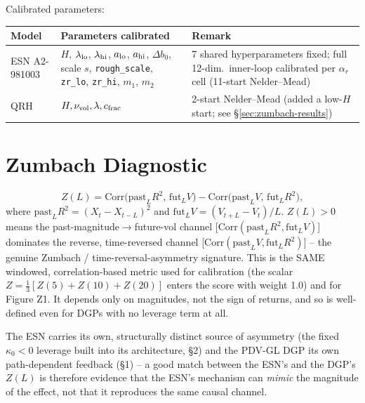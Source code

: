 \documentclass[11pt,a4paper]{article}
\begin{document}
Calibrated parameters:
\begin{center}\renewcommand{\arraystretch}{1.3}
\begin{tabular}{@{}p{3.0cm}p{6.4cm}p{5.0cm}@{}}\toprule
Model & Parameters calibrated & Remark \\\midrule
ESN A2-981003 & $H$, $\lambda_{\rm lo}$, $\lambda_{\rm hi}$, $a_{\rm lo}$,
  $a_{\rm hi}$, $\Delta b_0$, scale $s$, \texttt{rough\_scale},
  \texttt{zr\_lo}, \texttt{zr\_hi}, $m_1$, $m_2$ &
  7 shared hyperparameters fixed; full 12-dim.\ inner-loop calibrated
  per $\alpha_r$ cell (11-start Nelder--Mead) \\
QRH & $H,\nu_{\rm vol},\lambda,c_{\rm frac}$ & 2-start Nelder--Mead
  (added a low-$H$ start; see \S\ref{sec:zumbach-results}) \\
\bottomrule\end{tabular}\end{center}


\section{Zumbach Diagnostic}
\label{sec:windowed}

\begin{equation}
  Z(L) = \mathrm{Corr}\!\bigl(\mathrm{past}_L R^2,\,\mathrm{fut}_L V\bigr)
        - \mathrm{Corr}\!\bigl(\mathrm{past}_L V,\,\mathrm{fut}_L R^2\bigr),
  \label{eq:zumbach_scalar}
\end{equation}
where $\mathrm{past}_L R^2=(X_t{-}X_{t-L})^2$ and
$\mathrm{fut}_L V=(V_{t+L}{-}V_t)/L$. $Z(L)>0$ means the
past-magnitude$\to$future-vol channel [$\mathrm{Corr}(\mathrm{past}_LR^2,\mathrm{fut}_LV)$]
dominates the reverse, time-reversed channel
[$\mathrm{Corr}(\mathrm{past}_LV,\mathrm{fut}_LR^2)$] -- the genuine
Zumbach / time-reversal-asymmetry signature. This is the SAME windowed,
correlation-based metric used for calibration (the scalar
$Z=\tfrac{1}{3}[Z(5){+}Z(10){+}Z(20)]$ enters the score with weight
1.0) and for Figure Z1. It depends only on magnitudes, not the sign of
returns, and so is well-defined even for DGPs with no leverage term at
all.

The ESN carries its own, structurally distinct source of asymmetry (the
fixed $\kappa_0<0$ leverage built into its architecture, \S2) and the
PDV-GL DGP its own path-dependent feedback (\S1) -- a good match
between the ESN's and the DGP's $Z(L)$ is therefore evidence that the
ESN's mechanism can \emph{mimic} the magnitude of the effect, not that
it reproduces the same causal channel.
\end{document}
